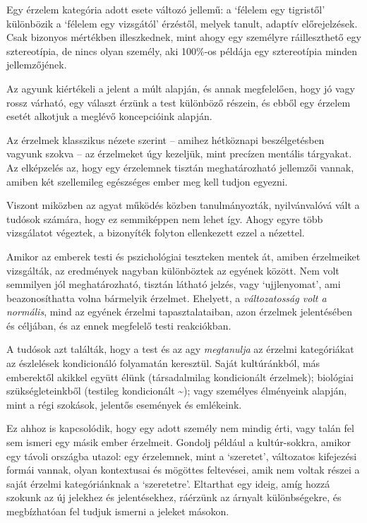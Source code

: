 Egy érzelem kategória adott esete változó jellemű: a `félelem egy
tigristől' különbözik a `félelem egy vizsgától' érzéstől, melyek tanult,
adaptív előrejelzések. Csak bizonyos mértékben illeszkednek, mint ahogy
egy személyre ráilleszthető egy sztereotípia, de nincs olyan személy,
aki 100\%-os példája egy sztereotípia minden jellemzőjének.

Az agyunk kiértékeli a jelent a múlt alapján, és annak megfelelően, hogy
jó vagy rossz várható, egy választ érzünk a test különböző részein, és
ebből egy érzelem esetét alkotjuk a meglévő koncepcióink alapján.


Az érzelmek klasszikus nézete szerint -- amihez hétköznapi
beszélgetésben vagyunk szokva -- az érzelmeket úgy kezeljük, mint
precízen mentális tárgyakat. Az elképzelés az, hogy egy érzelemnek
tisztán meghatározható jellemzői vannak, amiben két szellemileg
egészséges ember meg kell tudjon egyezni.

Viszont miközben az agyat működés közben tanulmányozták, nyilvánvalóvá
vált a tudósok számára, hogy ez semmiképpen nem lehet így. Ahogy egyre
több vizsgálatot végeztek, a bizonyíték folyton ellenkezett ezzel a
nézettel.

Amikor az emberek testi és pszichológiai teszteken mentek át, amiben
érzelmeiket vizsgálták, az eredmények nagyban különböztek az egyének
között. Nem volt semmilyen jól meghatározható, tisztán látható jelzés,
vagy `ujjlenyomat', ami beazonosíthatta volna bármelyik érzelmet.
Ehelyett, a \emph{változatosság volt a normális}, mind az egyének
érzelmi tapasztalataiban, azon érzelmek jelentésében és céljában, és az
ennek megfelelő testi reakciókban.

A tudósok azt találták, hogy a test és az agy \emph{megtanulja} az
érzelmi kategóriákat az észlelések kondicionáló folyamatán keresztül.
Saját kultúránkból, más emberektől akikkel együtt élünk (társadalmilag
kondicionált érzelmek); biológiai szükségleteinkből (testileg
kondicionált \textasciitilde); vagy személyes élményeink alapján, mint a
régi szokások, jelentős események és emlékeink.

Ez ahhoz is kapcsolódik, hogy egy adott személy nem mindig érti, vagy
talán fel sem ismeri egy másik ember érzelmeit. Gondolj például a
kultúr-sokkra, amikor egy távoli országba utazol: egy érzelemnek, mint a
`szeretet', változatos kifejezési formái vannak, olyan kontextusai és
mögöttes feltevései, amik nem voltak részei a saját érzelmi
kategóriánknak a `szeretetre'. Eltarthat egy ideig, amíg hozzá szokunk
az új jelekhez és jelentésekhez, ráérzünk az árnyalt különbségekre, és
megbízhatóan fel tudjuk ismerni a jeleket másokon.

